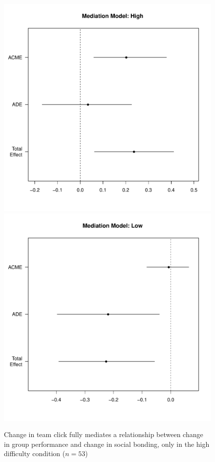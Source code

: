 \begin{figure}
  \centering
  \includegraphics[width=0.3\linewidth,keepaspectratio] {images/groupPerfClickChangeMedPlotHigh}
  \includegraphics[width=0.3\linewidth,keepaspectratio] {images/groupPerfClickChangeMedPlotLow}
  \caption{Change in team click fully mediates a relationship between change in group performance and change in social bonding, only in the high difficulty condition ($n = 53$)}
  \label{fig:groupPerfClickChangeMedPlotHighLow}
\end{figure}
















